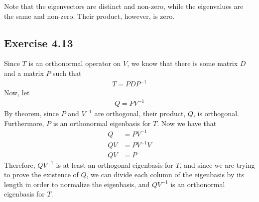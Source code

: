 \documentclass[letterpaper,12pt]{article}
\theoremstyle{definition}
\begin{document}
Note that the eigenvectors are distinct and non-zero, while the eigenvalues are the same and non-zero. Their product, however, is zero.

\subsection*{Exercise 4.13}

Since $T$ is an orthonormal operator on $V$, we know that there is some matrix $D$ and a matrix $P$ such that 
\begin{align*}
T = PDP^{-1}
\end{align*}
Now, let 
\begin{align*}
Q = PV^{-1}
\end{align*}
By theorem, since $P$ and $V^{-1}$ are orthogonal, their product, $Q$, is orthogonal. Furthermore, $P$ is an orthonormal eigenbasis for $T$. Now we have that
\begin{align*}
Q &= PV^{-1}\\
QV &= PV^{-1}V\\
QV &= P
\end{align*}
Therefore, $QV^{-1}$ is at least an orthogonal eigenbasis for $T$, and since we are trying to prove the existence of $Q$, we can divide each column of the eigenbasis by its length in order to normalize the eigenbasis, and $QV^{-1}$ is an orthonormal eigenbasis for $T$.
\end{document}
